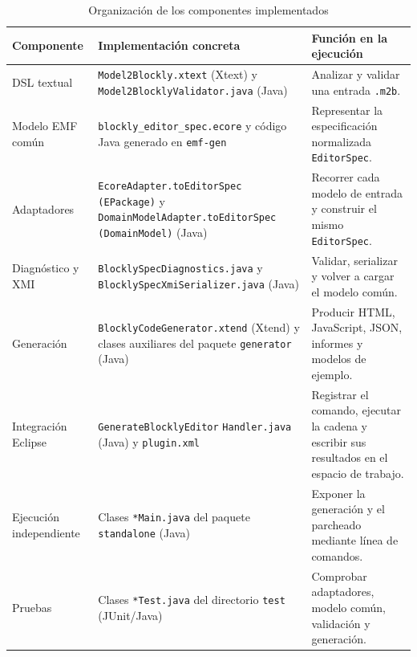 \begin{table}[H]
  \centering
  \small
  \setlength{\tabcolsep}{4pt}
  \begin{tabular}{@{}
      >{\raggedright\arraybackslash}p{}
      >{\raggedright\arraybackslash}p{}
      >{\raggedright\arraybackslash}p{}@{}}
    \toprule
    Componente & Implementación concreta & Función en la ejecución \\
    \midrule
    DSL textual & \texttt{Model2Blockly.xtext} (Xtext) y
    \texttt{Model2BlocklyValidator.java} (Java) & Analizar y validar una entrada
    \texttt{.m2b}. \\

    Modelo EMF común & \texttt{blockly\_editor\_spec.ecore} y código Java generado
    en \texttt{emf-gen} & Representar la especificación normalizada
    \texttt{EditorSpec}. \\

    Adaptadores & \texttt{EcoreAdapter.}\allowbreak\texttt{toEditorSpec}
    \allowbreak\texttt{(EPackage)} y
    \texttt{DomainModelAdapter.}\allowbreak\texttt{toEditorSpec}
    \allowbreak\texttt{(DomainModel)} (Java) & Recorrer cada
    modelo de entrada y construir el mismo \texttt{EditorSpec}. \\

    Diagnóstico y XMI & \texttt{BlocklySpecDiagnostics.java} y
    \texttt{BlocklySpecXmiSerializer.java} (Java) & Validar, serializar y volver a
    cargar el modelo común. \\

    Generación & \texttt{BlocklyCodeGenerator.xtend} (Xtend) y clases auxiliares
    del paquete \texttt{generator} (Java) & Producir HTML, JavaScript, JSON,
    informes y modelos de ejemplo. \\

    Integración Eclipse & \texttt{GenerateBlocklyEditor}\allowbreak
    \texttt{Handler.java} (Java) y \texttt{plugin.xml} & Registrar el comando,
    ejecutar la cadena y escribir sus resultados en el espacio de trabajo. \\

    Ejecución independiente & Clases \texttt{*Main.java} del paquete
    \texttt{standalone} (Java) & Exponer la generación y el parcheado mediante
    línea de comandos. \\

    Pruebas & Clases \texttt{*Test.java} del directorio \texttt{test}
    (JUnit/Java) & Comprobar adaptadores, modelo común, validación y generación. \\
    \bottomrule
  \end{tabular}
  \caption{Organización de los componentes implementados}
  \label{tab:paquetes-implementacion}
\end{table}

